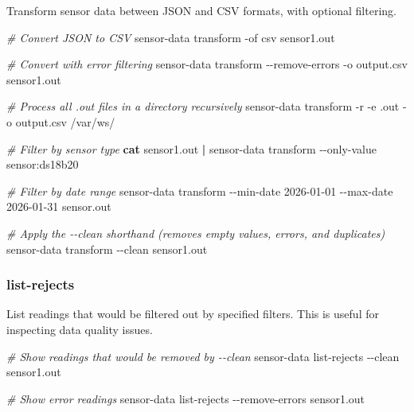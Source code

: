 \documentclass[
]{book}
\newenvironment{Shaded}{\begin{snugshade}}{\end{snugshade}}
\newcommand{\AttributeTok}[1]{\textcolor[rgb]{0.13,0.29,0.53}{#1}}
\newcommand{\CommentTok}[1]{\textcolor[rgb]{0.56,0.35,0.01}{\textit{#1}}}
\newcommand{\ExtensionTok}[1]{#1}
\newcommand{\FunctionTok}[1]{\textcolor[rgb]{0.13,0.29,0.53}{\textbf{#1}}}
\newcommand{\KeywordTok}[1]{\textcolor[rgb]{0.13,0.29,0.53}{\textbf{#1}}}
\newcommand{\NormalTok}[1]{#1}
\begin{document}
Transform sensor data between JSON and CSV formats, with optional filtering.

\begin{Shaded}
\begin{Highlighting}[]
\CommentTok{\# Convert JSON to CSV}
\ExtensionTok{sensor{-}data}\NormalTok{ transform }\AttributeTok{{-}of}\NormalTok{ csv sensor1.out}

\CommentTok{\# Convert with error filtering}
\ExtensionTok{sensor{-}data}\NormalTok{ transform }\AttributeTok{{-}{-}remove{-}errors} \AttributeTok{{-}o}\NormalTok{ output.csv sensor1.out}

\CommentTok{\# Process all .out files in a directory recursively}
\ExtensionTok{sensor{-}data}\NormalTok{ transform }\AttributeTok{{-}r} \AttributeTok{{-}e}\NormalTok{ .out }\AttributeTok{{-}o}\NormalTok{ output.csv /var/ws/}

\CommentTok{\# Filter by sensor type}
\FunctionTok{cat}\NormalTok{ sensor1.out }\KeywordTok{|} \ExtensionTok{sensor{-}data}\NormalTok{ transform }\AttributeTok{{-}{-}only{-}value}\NormalTok{ sensor:ds18b20}

\CommentTok{\# Filter by date range}
\ExtensionTok{sensor{-}data}\NormalTok{ transform }\AttributeTok{{-}{-}min{-}date}\NormalTok{ 2026{-}01{-}01 }\AttributeTok{{-}{-}max{-}date}\NormalTok{ 2026{-}01{-}31 sensor.out}

\CommentTok{\# Apply the {-}{-}clean shorthand (removes empty values, errors, and duplicates)}
\ExtensionTok{sensor{-}data}\NormalTok{ transform }\AttributeTok{{-}{-}clean}\NormalTok{ sensor1.out}
\end{Highlighting}
\end{Shaded}

\subsubsection{list-rejects}\label{list-rejects}

List readings that would be filtered out by specified filters. This is useful for inspecting data quality issues.

\begin{Shaded}
\begin{Highlighting}[]
\CommentTok{\# Show readings that would be removed by {-}{-}clean}
\ExtensionTok{sensor{-}data}\NormalTok{ list{-}rejects }\AttributeTok{{-}{-}clean}\NormalTok{ sensor1.out}

\CommentTok{\# Show error readings}
\ExtensionTok{sensor{-}data}\NormalTok{ list{-}rejects }\AttributeTok{{-}{-}remove{-}errors}\NormalTok{ sensor1.out}
\end{Highlighting}
\end{Shaded}
\end{document}
